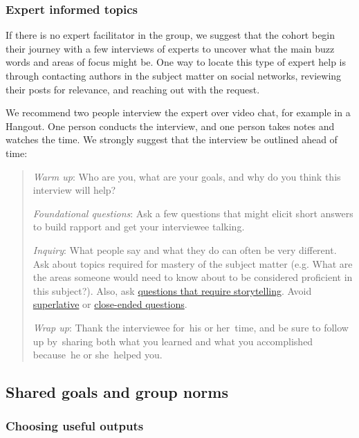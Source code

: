 \subsubsection{Expert informed topics}

If there is no expert facilitator in the group, we suggest that the
cohort begin their journey with a few interviews of experts to uncover
what the main buzz words and areas of focus might be. One way to locate
this type of expert help is through contacting authors in the subject
matter on social networks, reviewing their posts for relevance, and
reaching out with the request.

We recommend two people interview the expert over video chat, for
example in a Hangout. One person conducts the interview, and one person
takes notes and watches the time. We strongly suggest that the interview
be outlined ahead of time:

\begin{quote}
\emph{Warm up}: Who are you, what are your goals, and why do you think
this interview will help?

\emph{Foundational questions}: Ask a few questions that might elicit
short answers to build rapport and get your interviewee talking.

\emph{Inquiry}: What people say and what they do can often be very
different. Ask about topics required for mastery of the subject matter
(e.g. What are the areas someone would need to know about to be
considered proficient in this subject?). Also, ask
\href{http://en.wikipedia.org/wiki/Critical_Incident_Technique}{questions
that require storytelling}. Avoid
\href{http://en.wikipedia.org/wiki/Superlative}{superlative} or
\href{http://en.wikipedia.org/wiki/Closed-ended_question}{close-ended
questions}.

\emph{Wrap up}: Thank the interviewee for~his or her~time, and be sure
to follow up by~sharing both what you learned and what you accomplished
because~he or she~helped you.
\end{quote}

\subsection{Shared goals and group norms}

\subsubsection{Choosing useful outputs}

